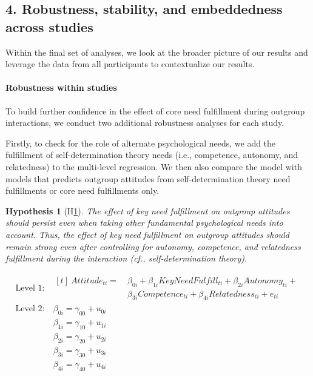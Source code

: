 \documentclass[man, 12pt, a4paper, mask]{apa7}
\theoremstyle{break}
\theoremstyle{plain}
\newtheorem{hyp}{Hypothesis}
\begin{document}
\subsection{4. Robustness, stability, and embeddedness across studies}
Within the final set of analyses, we look at the broader picture of our results and leverage the data from all participants to contextualize our results.  

\paragraph{Robustness within studies}
To build further confidence in the effect of core need fulfillment during outgroup interactions, we conduct two additional robustness analyses for each study.

Firstly, to check for the role of alternate psychological needs, we add the fulfillment of self-determination theory needs (i.e., competence, autonomy, and relatedness) to the multi-level regression. We then also compare the model with models that predicts outgroup attitudes from self-determination theory need fulfillments or core need fulfillments only. 

\begin{mdframed}[style=mdfhypothesis]
    \begin{hyp}[H\ref{hyp:keyNeedSDT}] \label{hyp:keyNeedSDT}
    The effect of key need fulfillment on outgroup attitudes should persist even when taking other fundamental psychological needs into account. Thus, the effect of key need fulfillment on outgroup attitudes should remain strong even after controlling for autonomy, competence, and relatedness fulfillment during the interaction (cf., self-determination theory). 
    \end{hyp}

    \begin{fleqn}[\eqskip-\subhypskip]
      \begin{equation} \label{eq:SlopesAttCoreSdt}
        \begin{split}
          \textrm{Level 1:} &
            \begin{aligned}[t]
              \ Attitude_{ti} =  &\ \beta_{0i} + \beta_{1i}KeyNeedFulfill_{ti} + \beta_{2i}Autonomy_{ti} + \\
                                 &\ \beta_{3i}Competence_{ti} + \beta_{4i}Relatedness_{ti} + e_{ti}
            \end{aligned} \\
          \textrm{Level 2:} &\ \beta_{0i} = \gamma_{00} + u_{0i} \\
                            &\ \beta_{1i} = \gamma_{10} + u_{1i} \\
                            &\ \beta_{2i} = \gamma_{20} + u_{2i} \\
                            &\ \beta_{3i} = \gamma_{30} + u_{3i} \\
                            &\ \beta_{4i} = \gamma_{40} + u_{4i}
        \end{split} 
      \end{equation}
    \end{fleqn}
\end{mdframed}
\end{document}
